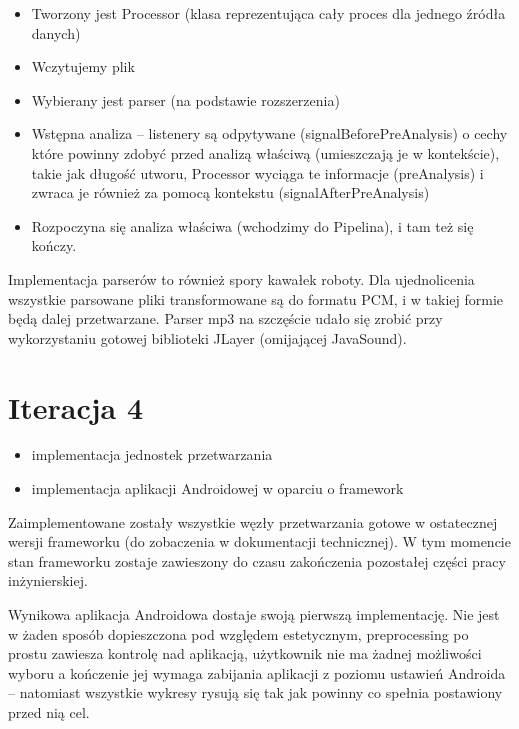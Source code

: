 \begin{Note}
\begin{itemize}
    \item Tworzony jest Processor (klasa reprezentująca cały proces dla jednego źródła danych)
    \item Wczytujemy plik
    \item Wybierany jest parser (na podstawie rozszerzenia)
    \item Wstępna analiza -- listenery są odpytywane (signalBeforePreAnalysis) o cechy które powinny zdobyć przed analizą właściwą (umieszczają je w kontekście), takie jak długość utworu, Processor wyciąga te informacje (preAnalysis) i zwraca je również za pomocą kontekstu (signalAfterPreAnalysis)
    \item Rozpoczyna się analiza właściwa (wchodzimy do Pipelina), i tam też się kończy.
\end{itemize}

Implementacja parserów to również spory kawałek roboty. Dla ujednolicenia wszystkie parsowane pliki transformowane są do formatu PCM, i w takiej formie będą dalej przetwarzane. Parser mp3 na szczęście udało się zrobić przy wykorzystaniu gotowej biblioteki JLayer (omijającej JavaSound).

\end{Note}

\section{Iteracja 4}

\begin{Note}


\begin{itemize}
    \item implementacja jednostek przetwarzania
    \item implementacja aplikacji Androidowej w oparciu o framework
\end{itemize}

Zaimplementowane zostały wszystkie węzły przetwarzania gotowe w ostatecznej wersji frameworku (do zobaczenia w dokumentacji technicznej). W tym momencie stan frameworku zostaje zawieszony do czasu zakończenia pozostałej części pracy inżynierskiej.

Wynikowa aplikacja Androidowa dostaje swoją pierwszą implementację. Nie jest w żaden sposób
dopieszczona pod względem estetycznym, preprocessing po prostu zawiesza kontrolę nad aplikacją,
użytkownik nie ma żadnej możliwości wyboru a kończenie jej wymaga zabijania aplikacji z poziomu
ustawień Androida -- natomiast wszystkie wykresy rysują się tak jak powinny co spełnia postawiony przed nią cel.

\end{Note}

